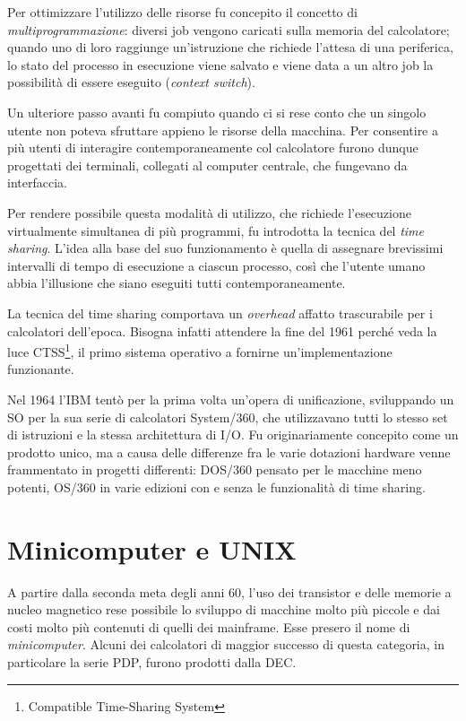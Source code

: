 \documentclass[12pt,a4paper]{report}
\begin{document}
		Per ottimizzare l'utilizzo delle risorse fu concepito il concetto di \emph{multiprogrammazione}: diversi job
		vengono caricati sulla memoria del calcolatore; quando uno di loro raggiunge un'istruzione che richiede
		l'attesa di una periferica, lo stato del processo in esecuzione viene salvato e viene data a un altro job
		la possibilità di essere eseguito (\emph{context switch}).
		
		Un ulteriore passo avanti fu compiuto quando ci si rese conto che un singolo utente non poteva sfruttare
		appieno le risorse della macchina. Per consentire a più utenti di interagire contemporaneamente col calcolatore
		furono dunque progettati dei terminali, collegati al computer centrale, che fungevano da interfaccia.
		
		Per rendere possibile questa modalità di utilizzo, che richiede l'esecuzione virtualmente simultanea di
		più programmi, fu introdotta la tecnica del \emph{time sharing}. L'idea alla base del suo funzionamento
		è quella di assegnare brevissimi intervalli di tempo di esecuzione a ciascun processo, così che l'utente
		umano abbia l'illusione che siano eseguiti tutti contemporaneamente.
		
		La tecnica del time sharing comportava un \emph{overhead} affatto trascurabile per i calcolatori dell'epoca.
		Bisogna infatti attendere la fine del 1961 perché veda la luce CTSS\footnote{Compatible Time-Sharing System},
		il primo sistema operativo a fornirne un'implementazione funzionante.
		
		Nel 1964 l'IBM tentò per la prima volta un'opera di unificazione, sviluppando un SO per la sua serie di
		calcolatori System/360, che utilizzavano tutti lo stesso set di istruzioni e la stessa architettura di I/O.
		Fu originariamente concepito come un prodotto unico, ma a causa delle differenze fra le varie dotazioni hardware
		venne frammentato in progetti differenti: DOS/360 pensato per le macchine meno potenti, OS/360 in varie edizioni
		con e senza le funzionalità di time sharing.
		
	\section{Minicomputer e UNIX}
		A partire dalla seconda meta degli anni 60, l'uso dei transistor e delle memorie a nucleo magnetico rese
		possibile lo sviluppo di macchine molto più piccole e dai costi molto più contenuti di quelli dei mainframe.
		Esse presero il nome di \emph{minicomputer}. Alcuni dei calcolatori di maggior successo di questa categoria,
		in particolare la serie PDP, furono prodotti dalla DEC.
		
\end{document}
